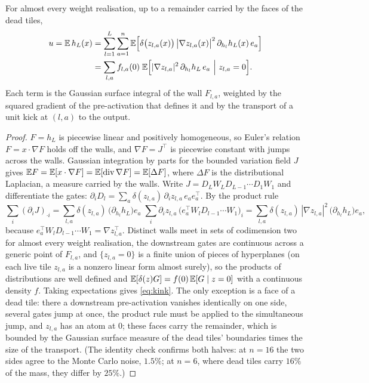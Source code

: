 \begin{theorem}\label{thm:kink}
For almost every weight realisation, up to a remainder carried by the faces of the dead tiles,
\begin{equation}\label{eq:kink}
\begin{split}
u=\mathbb E\,h_L(x)&=\sum_{l=1}^{L}\sum_{a=1}^{n}\mathbb E\Big[\delta\big(z_{l,a}(x)\big)\,\big|\nabla z_{l,a}(x)\big|^2\,
\partial_{h_l}h_L(x)\,e_a\Big]\\
&=\sum_{l,a}f_{l,a}(0)\;\mathbb E\Big[|\nabla z_{l,a}|^2\,\partial_{h_l}h_L\,e_a\ \Big|\ z_{l,a}=0\Big].
\end{split}
\end{equation}
Each term is the Gaussian surface integral of the wall $F_{l,a}$, weighted by the squared gradient of the
pre-activation that defines it and by the transport of a unit kick at $(l,a)$ to the output.
\end{theorem}
\begin{proof}
$F=h_L$ is piecewise linear and positively homogeneous, so Euler's relation $F=x\cdot\nabla F$ holds off the walls, and
$\nabla F=J^{\top}$ is piecewise constant with jumps across the walls. Gaussian integration by parts for the bounded
variation field $J$ gives $\mathbb E F=\mathbb E[x\cdot\nabla F]=\mathbb E[\operatorname{div}\nabla F]=\mathbb E[\Delta F]$, where $\Delta F$ is the
distributional Laplacian, a measure carried by the walls. Write $J=D_LW_LD_{L-1}\cdots D_1W_1$ and differentiate the
gates: $\partial_iD_l=\sum_a\delta(z_{l,a})\,\partial_iz_{l,a}\,e_ae_a^{\top}$. By the product rule
\[
\textstyle\sum_i(\partial_iJ)_{\cdot i}=\sum_{l,a}\delta(z_{l,a})\,\big(\partial_{h_l}h_L\big)e_a\;\sum_i\partial_iz_{l,a}\,
\big(e_a^{\top}W_lD_{l-1}\cdots W_1\big)_i=\sum_{l,a}\delta(z_{l,a})\,|\nabla z_{l,a}|^2\,\big(\partial_{h_l}h_L\big)e_a ,
\]
because $e_a^{\top}W_lD_{l-1}\cdots W_1=\nabla z_{l,a}^{\top}$. Distinct walls meet in sets of codimension two for almost
every weight realisation, the downstream gates are continuous across a generic point of $F_{l,a}$, and
$\{z_{l,a}=0\}$ is a finite union of pieces of hyperplanes (on each live tile $z_{l,a}$ is a nonzero linear form
almost surely), so the products of distributions are well defined and $\mathbb E[\delta(z)G]=f(0)\,\mathbb E[G\mid z=0]$ with a continuous
density $f$. Taking expectations gives \eqref{eq:kink}. The only exception is a face of a dead tile: there a
downstream pre-activation vanishes identically on one side, several gates jump at once, the product rule must be
applied to the simultaneous jump, and $z_{l,a}$ has an atom at $0$; these faces carry the remainder, which is bounded by the
Gaussian surface measure of the dead tiles' boundaries times the size of the transport. (The identity check confirms
both halves: at $n=16$ the two sides agree to the Monte Carlo noise, $1.5\%$; at $n=6$, where dead tiles carry $16\%$
of the mass, they differ by $25\%$.)
\end{proof}


